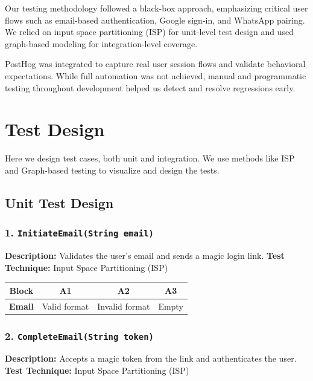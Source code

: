 Our testing methodology followed a black-box approach, emphasizing critical user flows such as email-based authentication, Google sign-in, and WhatsApp pairing. We relied on input space partitioning (ISP) for unit-level test design and used graph-based modeling for integration-level coverage.

PostHog was integrated to capture real user session flows and validate behavioral expectations. While full automation was not achieved, manual and programmatic testing throughout development helped us detect and resolve regressions early.

\section{Test Design}

Here we design test cases, both unit and integration. We use methods like ISP and Graph-based testing to visualize and design the tests.

\subsection{Unit Test Design}

\subsubsection*{1. \texttt{InitiateEmail(String email)}}

\textbf{Description:} Validates the user’s email and sends a magic login link.  
\textbf{Test Technique:} Input Space Partitioning (ISP)

\begin{table}[h!]
\centering
\begin{tabular}{|c|c|c|c|}
\hline
\textbf{Block} & \textbf{A1} & \textbf{A2} & \textbf{A3} \\
\hline
\textbf{Email} & Valid format & Invalid format & Empty \\
\hline
\end{tabular}
\end{table}

\subsubsection*{2. \texttt{CompleteEmail(String token)}}

\textbf{Description:} Accepts a magic token from the link and authenticates the user.  
\textbf{Test Technique:} Input Space Partitioning (ISP)

